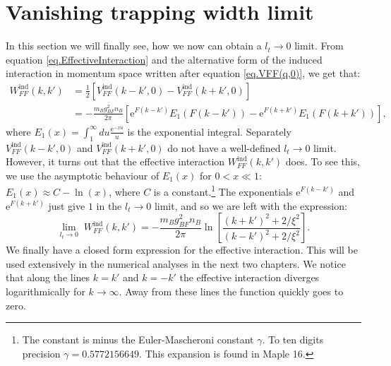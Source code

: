 \section{Vanishing trapping width limit}
In this section we will finally see, how we now can obtain a $l_t\to 0$ limit. From equation \eqref{eq.EffectiveInteraction} and the alternative form of the induced interaction in momentum space written after equation \eqref{eq.VFF(q,0)}, we get that:
\begin{align}
W^\text{ind}_{FF}(k,k') &= \frac{1}{2}\left[V^\text{ind}_{FF}(k-k',0) - V^\text{ind}_{FF}(k+k',0)\right] \nonumber \\
&= -\frac{m_Bg_{BF}^2n_B}{2\pi}\left[ \text{e}^{F(k-k')} E_1(F(k-k')) - \text{e}^{F(k+k')} E_1(F(k+k')) \right], \nonumber
\end{align}
where $E_1(x) = \int_1^\infty du \frac{\text{e}^{-xu}}{u}$ is the exponential integral. Separately $V^\text{ind}_{FF}(k-k',0)$ and $V^\text{ind}_{FF}(k+k',0)$ do not have a well-defined $l_t \to 0$ limit. However, it turns out that the effective interaction $W^\text{ind}_{FF}(k,k')$ does. To see this, we use the asymptotic behaviour of $E_1(x)$ for $0 < x \ll 1$: $E_1(x) \approx C -\ln(x)$, where $C$ is a constant.\footnote{The constant is minus the Euler-Mascheroni constant $\gamma$. To ten digits precision $\gamma = 0.5772156649$. This expansion is found in Maple 16.} The exponentials $\text{e}^{F(k-k')}$ and $\text{e}^{F(k+k')}$ just give $1$ in the $l_t \to 0$ limit, and so we are left with the expression:
\begin{equation}
\lim_{l_t \to 0} \; W^\text{ind}_{FF}(k,k') = -\frac{m_Bg_{BF}^2n_B}{2\pi} \ln\left[\frac{(k+k')^2+2/\xi^2}{(k-k')^2+2/\xi^2}\right].
\label{eq.EffectiveInteractionlt=0} 
\end{equation}
We finally have a closed form expression for the effective interaction. This will be used extensively in the numerical analyses in the next two chapters. We notice that along the lines $k = k'$ and $k = -k'$ the effective interaction diverges logarithmically for $k\to \infty$. Away from these lines the function quickly goes to zero.



